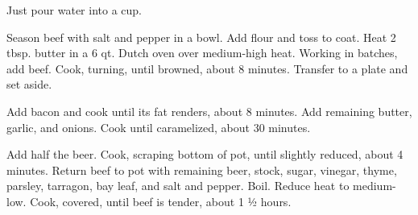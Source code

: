 \documentclass{cookbook}
\begin{document}


Just pour water into a cup.



Season beef with salt and pepper in a bowl. Add flour and toss to coat. Heat 2 tbsp. butter in a 6 qt. Dutch oven over medium-high heat. Working in batches, add beef. Cook, turning, until browned, about 8 minutes. Transfer to a plate and set aside.

Add bacon and cook until its fat renders, about 8 minutes. Add remaining butter, garlic, and onions. Cook until caramelized, about 30 minutes.

Add half the beer. Cook, scraping bottom of pot, until slightly reduced, about 4 minutes. Return beef to pot with remaining beer, stock, sugar, vinegar, thyme, parsley, tarragon, bay leaf, and salt and pepper. Boil. Reduce heat to medium-low. Cook, covered, until beef is tender, about 1 ½ hours.


\end{document}
